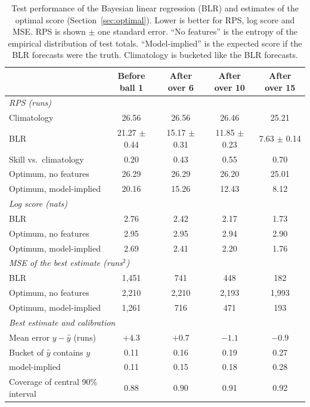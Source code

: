 \documentclass{article}
\newcommand{\1}{\mathbf{1}}
\begin{document}
\begin{table}[t]
\centering
\caption{Test performance of the Bayesian linear regression (BLR) and estimates of the optimal score (Section~\ref{sec:optimal}). Lower is better for RPS, log score and MSE. RPS is shown $\pm$ one standard error. ``No features'' is the entropy of the empirical distribution of test totals. ``Model-implied'' is the expected score if the BLR forecasts were the truth. Climatology is bucketed like the BLR forecasts.}
\label{tab:demo}
\small
\begin{tabular}{lcccc}
\toprule
 & Before ball 1 & After over 6 & After over 10 & After over 15 \\
\midrule
\multicolumn{5}{l}{\emph{RPS (runs)}} \\
\quad Climatology & 26.56 & 26.56 & 26.46 & 25.21 \\
\quad BLR & 21.27 {\scriptsize $\pm$ 0.44} & 15.17 {\scriptsize $\pm$ 0.31} & 11.85 {\scriptsize $\pm$ 0.23} & 7.63 {\scriptsize $\pm$ 0.14} \\
\quad Skill vs.\ climatology & 0.20 & 0.43 & 0.55 & 0.70 \\
\quad Optimum, no features & 26.29 & 26.29 & 26.20 & 25.01 \\
\quad Optimum, model-implied & 20.16 & 15.26 & 12.43 & 8.12 \\
\midrule
\multicolumn{5}{l}{\emph{Log score (nats)}} \\
\quad BLR & 2.76 & 2.42 & 2.17 & 1.73 \\
\quad Optimum, no features & 2.95 & 2.95 & 2.94 & 2.90 \\
\quad Optimum, model-implied & 2.69 & 2.41 & 2.20 & 1.76 \\
\midrule
\multicolumn{5}{l}{\emph{MSE of the best estimate (runs$^2$)}} \\
\quad BLR & 1{,}451 & 741 & 448 & 182 \\
\quad Optimum, no features & 2{,}210 & 2{,}210 & 2{,}193 & 1{,}993 \\
\quad Optimum, model-implied & 1{,}261 & 716 & 471 & 193 \\
\midrule
\multicolumn{5}{l}{\emph{Best estimate and calibration}} \\
\quad Mean error $y - \hat y$ (runs) & $+4.3$ & $+0.7$ & $-1.1$ & $-0.9$ \\
\quad Bucket of $\hat y$ contains $y$ & 0.11 & 0.16 & 0.19 & 0.27 \\
\quad \quad model-implied & 0.11 & 0.15 & 0.18 & 0.28 \\
\quad Coverage of central 90\% interval & 0.88 & 0.90 & 0.91 & 0.92 \\
\bottomrule
\end{tabular}
\end{table}
\end{document}
